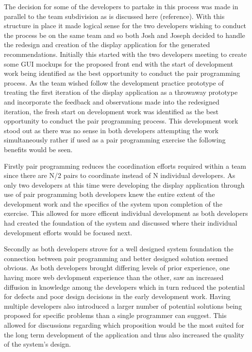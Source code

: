 \documentclass{l3proj}
\begin{document}
The decision for some of the developers to partake in this process was made in parallel to the team subdivision as is discussed here (reference). With this structure in place it made logical sense for the two developers wishing to conduct the process be on the same team and so both Josh and Joseph decided to handle the redesign and creation of the display application for the generated recommendations. Initially this started with the two developers meeting to create some GUI mockups for the proposed front end with the start of development work being identified as the best opportunity to conduct the pair programming process. As the team wished follow the development practice prototype of treating the first iteration of the display application as a throwaway prototype and incorporate the feedback and observations made into the redesigned iteration, the fresh start on development work was identified as the best opportunity to conduct the pair programming process. This development work stood out as there was no sense in both developers attempting the work simultaneously rather if used as a pair programming exercise the following benefits would be seen.

Firstly pair programming reduces the coordination efforts required within a team since there are N/2 pairs to coordinate instead of N individual developers. As only two developers at this time were developing the display application through use of pair programming both developers knew the entire extent of the development work and the specifics of the system upon completion of the exercise. This allowed for more efficent individual development as both developers had created the foundation of the system and discussed where their individual development efforts would be focused next. 

Secondly as both developers strove for a well designed system foundation the connection between pair programming and better designed solution seemed obvious. As both developers brought differing levels of prior experience, one having more web devlopment experience than the other, saw an increased diffusion in knowledge among the developers which in turn reduced the potential for defects and poor design decisions in the early development work. Having multiple developers also introduced a larger number of potential solutions being proposed for specific problems than a single programmer can suggest. This allowed for discussions regarding which proposition would be the most suited for the long term development of the application and thus also increased the quality of the system's design.  
\end{document}
